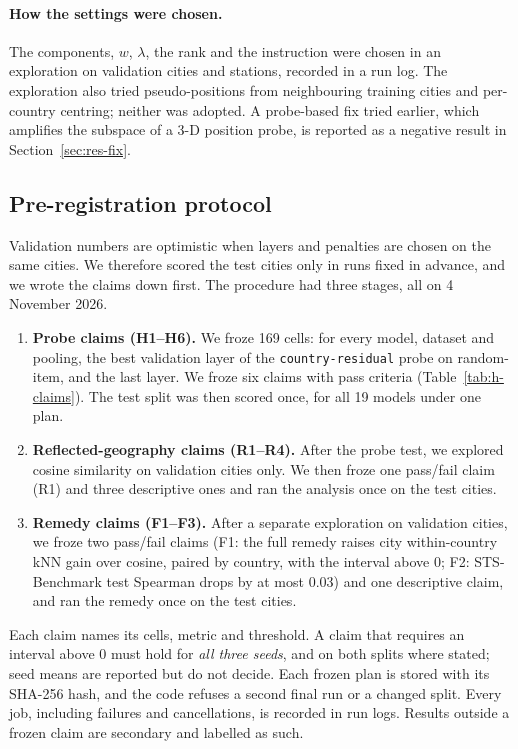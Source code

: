 \paragraph{How the settings were chosen.}
The components, $w$, $\lambda$, the rank and the instruction were chosen in an exploration on validation cities and stations, recorded in a run log. The exploration also tried pseudo-positions from neighbouring training cities and per-country centring; neither was adopted. A probe-based fix tried earlier, which amplifies the subspace of a 3-D position probe, is reported as a negative result in Section~\ref{sec:res-fix}.

\subsection{Pre-registration protocol}
\label{sec:method-prereg}

Validation numbers are optimistic when layers and penalties are chosen on the same cities. We therefore scored the test cities only in runs fixed in advance, and we wrote the claims down first. The procedure had three stages, all on 4 November 2026.

\begin{enumerate}
\item \textbf{Probe claims (H1--H6).} We froze 169 cells: for every model, dataset and pooling, the best validation layer of the \texttt{country-residual} probe on random-item, and the last layer. We froze six claims with pass criteria (Table~\ref{tab:h-claims}). The test split was then scored once, for all 19 models under one plan.
\item \textbf{Reflected-geography claims (R1--R4).} After the probe test, we explored cosine similarity on validation cities only. We then froze one pass/fail claim (R1) and three descriptive ones and ran the analysis once on the test cities.
\item \textbf{Remedy claims (F1--F3).} After a separate exploration on validation cities, we froze two pass/fail claims (F1: the full remedy raises city within-country kNN gain over cosine, paired by country, with the interval above 0; F2: STS-Benchmark test Spearman drops by at most 0.03) and one descriptive claim, and ran the remedy once on the test cities.
\end{enumerate}

Each claim names its cells, metric and threshold. A claim that requires an interval above 0 must hold for \emph{all three seeds}, and on both splits where stated; seed means are reported but do not decide. Each frozen plan is stored with its SHA-256 hash, and the code refuses a second final run or a changed split. Every job, including failures and cancellations, is recorded in run logs. Results outside a frozen claim are secondary and labelled as such.

